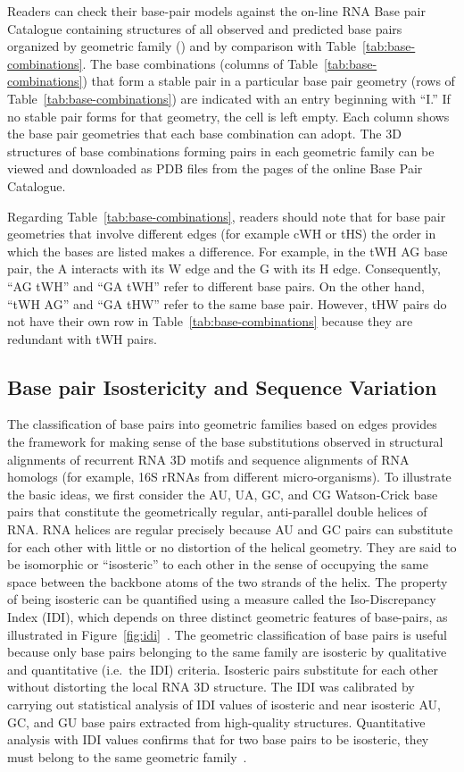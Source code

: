 Readers can check their base-pair models against the on-line RNA Base pair
Catalogue containing structures of all observed and predicted base pairs
organized by geometric family () and
by comparison with Table~\ref{tab:base-combinations}. The base combinations
(columns of Table~\ref{tab:base-combinations}) that form a stable pair in a
particular base pair geometry (rows of Table~\ref{tab:base-combinations}) are
indicated with an entry beginning with ``I.'' If no stable pair forms for that
geometry, the cell is left empty. Each column shows the base pair geometries
that each base combination can adopt. The 3D structures of base combinations
forming pairs in each geometric family can be viewed and downloaded as PDB files
from the pages of the online Base Pair Catalogue. 

Regarding Table~\ref{tab:base-combinations}, readers should note that for base pair geometries that
involve different edges (for example cWH or tHS) the order in which the bases
are listed makes a difference. For example, in the tWH AG base pair, the A
interacts with its W edge and the G with its H edge. Consequently, ``AG tWH''
and ``GA tWH'' refer to different base pairs. On the other hand, ``tWH AG'' and
``GA tHW'' refer to the same base pair. However, tHW pairs do not have their own
row in Table~\ref{tab:base-combinations} because they are redundant with tWH pairs. 

\subsection{Base pair Isostericity and Sequence Variation}

The classification of base pairs into geometric families based on edges provides
the framework for making sense of the base substitutions observed in structural
alignments of recurrent RNA 3D motifs and sequence alignments of RNA homologs
(for example, 16S rRNAs from different micro-organisms). To illustrate the basic
ideas, we first consider the AU, UA, GC, and CG Watson-Crick base pairs that
constitute the geometrically regular, anti-parallel double helices of RNA\@. RNA
helices are regular precisely because AU and GC pairs can substitute for each
other with little or no distortion of the helical geometry. They are said to be
isomorphic or “isosteric” to each other in the sense of occupying the same space
between the backbone atoms of the two strands of the helix. The property of
being isosteric can be quantified using a measure called the Iso-Discrepancy
Index (IDI), which depends on three distinct geometric features of base-pairs,
as illustrated in Figure~\ref{fig:idi}~\cite{Stombaugh2009}. The geometric
classification of base pairs is useful because only base pairs belonging to the
same family are isosteric by qualitative and quantitative (i.e.\ the IDI)
criteria. Isosteric pairs substitute for each other without distorting the local
RNA 3D structure. The IDI was calibrated by carrying out statistical analysis of
IDI values of isosteric and near isosteric AU, GC, and GU base pairs extracted
from high-quality structures. Quantitative analysis with IDI values confirms
that for two base pairs to be isosteric, they must belong to the same geometric
family~\cite{Stombaugh2009}. 

